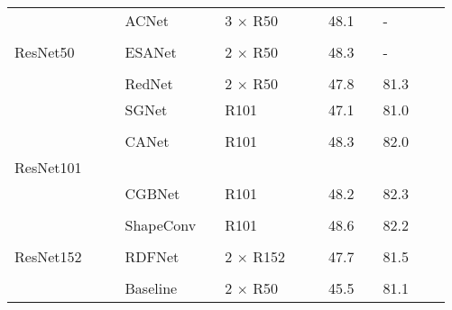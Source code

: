 \documentclass{aims}
\numberwithin{equation}{section}
\begin{document}
\begin{table}[t]
\begin{tabular}{lllllllllllll}
    \midrule
          &       &       & ACNet\cite{hu2019acnet} &       &        3 $\times$  R50 &       &       & 48.1  &       &        - \\
          &       &       &       &       &       &       &       &       &       &       &         \\
    ResNet50 &       &       & ESANet\cite{seichter2021efficient} &       &        2 $\times$  R50 &       &       & 48.3  &       &        - \\
          &       &       &       &       &       &       &       &       &       &       &         \\
          &       &       & RedNet\cite{jiang2018rednet} &       &        2 $\times$  R50 &       &       & 47.8  &       &        81.3 \\
    \midrule
          &       &       & SGNet\cite{chen2021spatial} &       &       R101  &       &       & 47.1  &       &        81.0 \\
          &       &       &       &       &       &       &       &       &       &       &         \\
          &       &       & CANet\cite{tang2021attention} &       &        R101  &       &       & 48.3  &       &        82.0 \\
    ResNet101 &       &       &       &       &       &       &       &       &       &       &         \\
          &       &       & CGBNet\cite{ding2020semantic} &       &        R101  &       &       & 48.2  &       &        82.3 \\
          &       &       &       &       &       &       &       &       &       &       &         \\
          &       &       & ShapeConv\cite{cao2021shapeconv} &       &        R101  &       &       & 48.6  &       &        82.2 \\
    \midrule
          &       &       &       &       &       &       &       &       &       &       &         \\
    ResNet152 &       &       & RDFNet\cite{park2017rdfnet} &       &        2 $\times$  R152 &       &       & 47.7  &       &        81.5 \\
          &       &       &       &       &       &       &       &       &       &       &         \\
          &       &       & Baseline &       &        2 $\times$  R50 &       &       & 45.5  &       &        81.1 \\

\end{tabular}
\end{table}
\end{document}
